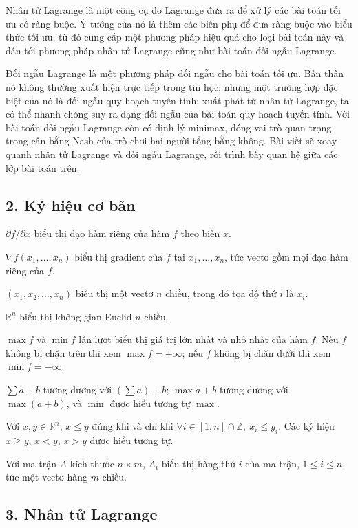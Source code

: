 \documentclass[11pt]{article}
\begin{document}
Nhân tử Lagrange là một công cụ do Lagrange đưa ra để xử lý các bài toán tối ưu
có ràng buộc. Ý tưởng của nó là thêm các biến phụ để đưa ràng buộc vào biểu
thức tối ưu, từ đó cung cấp một phương pháp hiệu quả cho loại bài toán này và
dẫn tới phương pháp nhân tử Lagrange cũng như bài toán đối ngẫu Lagrange.

Đối ngẫu Lagrange là một phương pháp đối ngẫu cho bài toán tối ưu. Bản thân nó
không thường xuất hiện trực tiếp trong tin học, nhưng một trường hợp đặc biệt
của nó là đối ngẫu quy hoạch tuyến tính; xuất phát từ nhân tử Lagrange, ta có
thể nhanh chóng suy ra dạng đối ngẫu của bài toán quy hoạch tuyến tính. Với bài
toán đối ngẫu Lagrange còn có định lý minimax, đóng vai trò quan trọng trong
cân bằng Nash của trò chơi hai người tổng bằng không. Bài viết sẽ xoay quanh
nhân tử Lagrange và đối ngẫu Lagrange, rồi trình bày quan hệ giữa các lớp bài
toán trên.

\subsection*{2. Ký hiệu cơ bản}

\(\partial f/\partial x\) biểu thị đạo hàm riêng của hàm \(f\) theo biến \(x\).

\(\nabla f(x_1,\ldots,x_n)\) biểu thị gradient của \(f\) tại
\(x_1,\ldots,x_n\), tức vectơ gồm mọi đạo hàm riêng của \(f\).

\((x_1,x_2,\ldots,x_n)\) biểu thị một vectơ \(n\) chiều, trong đó tọa độ thứ
\(i\) là \(x_i\).

\(\mathbb R^n\) biểu thị không gian Euclid \(n\) chiều.

\(\max f\) và \(\min f\) lần lượt biểu thị giá trị lớn nhất và nhỏ nhất của
hàm \(f\). Nếu \(f\) không bị chặn trên thì xem \(\max f=+\infty\); nếu \(f\)
không bị chặn dưới thì xem \(\min f=-\infty\).

\(\sum a+b\) tương đương với \((\sum a)+b\); \(\max a+b\) tương đương với
\(\max(a+b)\), và \(\min\) được hiểu tương tự \(\max\).

Với \(x,y\in\mathbb R^n\), \(x\le y\) đúng khi và chỉ khi
\(\forall i\in[1,n]\cap\mathbb Z,\ x_i\le y_i\). Các ký hiệu \(x\ge y\),
\(x<y\), \(x>y\) được hiểu tương tự.

Với ma trận \(A\) kích thước \(n\times m\), \(A_i\) biểu thị hàng thứ \(i\) của
ma trận, \(1\le i\le n\), tức một vectơ hàng \(m\) chiều.

\subsection*{3. Nhân tử Lagrange}
\end{document}
